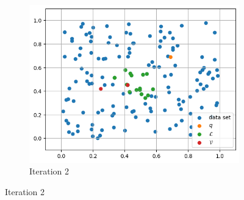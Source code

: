 \begin{figure}[ht]
\begin{subfigure}{0.31\textwidth}
        \includegraphics[width=\textwidth]{images/greedy-search-2}
        \caption{Iteration 2}
        \label{fig:gs2}
    \end{subfigure}
    \hfill


\end{figure}
